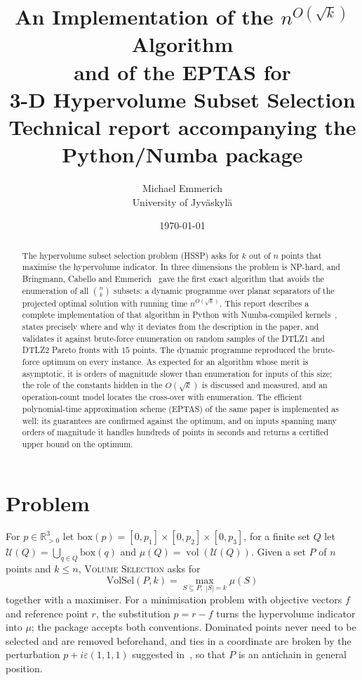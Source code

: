 \documentclass[12pt,a4paper]{article}
\title{An Implementation of the $n^{O(\sqrt{k})}$ Algorithm\\ and of the EPTAS for\\
3-D Hypervolume Subset Selection\\[0.5ex]
\large Technical report accompanying the \code{hssp3d} Python/Numba package}
\author{Michael Emmerich\\[0.5ex]
\normalsize University of Jyv\"askyl\"a}
\date{\today}
\newcommand{\vol}{\operatorname{vol}}
\newcommand{\U}{\mathcal{U}}
\newcommand{\R}{\mathbb{R}}
\begin{document}
\maketitle
\begingroup
\renewcommand{\thefootnote}{}
\endgroup

\begin{abstract}
\noindent
The hypervolume subset selection problem (HSSP) asks for $k$ out of $n$ points that
maximise the hypervolume indicator.  In three dimensions the problem is NP-hard, and
Bringmann, Cabello and Emmerich~\cite{BCE} gave the first exact algorithm that avoids
the enumeration of all $\binom{n}{k}$ subsets: a dynamic programme over planar separators
of the projected optimal solution with running time $n^{O(\sqrt{k})}$.  This report
describes a complete implementation of that algorithm in Python with Numba-compiled
kernels~\cite{Numba}, states precisely where and why it deviates from the description in the paper,
and validates it against brute-force enumeration on random samples of the DTLZ1 and DTLZ2
Pareto fronts with $15$ points.  The dynamic programme reproduced the brute-force optimum
on every instance.  As expected for an algorithm whose merit is asymptotic, it is orders of
magnitude slower than enumeration for inputs of this size; the role of the constants hidden
in the $O(\sqrt{k})$ is discussed and measured, and an operation-count model locates the cross-over with
enumeration.  The efficient polynomial-time approximation scheme (EPTAS) of the same paper is implemented as
well: its guarantees are confirmed against the optimum, and on inputs spanning many orders of magnitude it
handles hundreds of points in seconds and returns a certified upper bound on the optimum.
\end{abstract}

\section{Problem}
For $p\in\R^3_{>0}$ let $\mathrm{box}(p)=[0,p_1]\times[0,p_2]\times[0,p_3]$, for a finite
set $Q$ let $\U(Q)=\bigcup_{q\in Q}\mathrm{box}(q)$ and $\mu(Q)=\vol(\U(Q))$.  Given a set
$P$ of $n$ points and $k\le n$, \textsc{Volume Selection} asks for
\[
  \mathrm{VolSel}(P,k)=\max_{S\subseteq P,\;|S|=k}\mu(S)
\]
together with a maximiser.  For a minimisation problem with objective vectors $f$ and
reference point $r$, the substitution $p=r-f$ turns the hypervolume indicator into $\mu$;
the package accepts both conventions.  Dominated points never need to be selected and are
removed beforehand, and ties in a coordinate are broken by the perturbation
$p+i\varepsilon(1,1,1)$ suggested in~\cite{BCE}, so that $P$ is an antichain in general
position.
\end{document}
